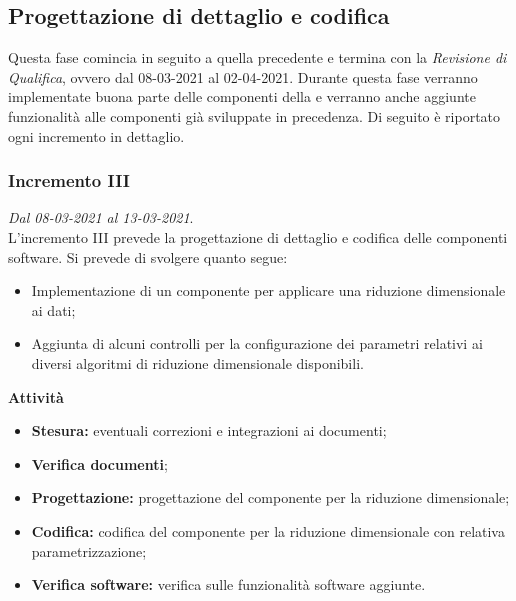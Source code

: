 \subsection{Progettazione di dettaglio e codifica}
Questa fase comincia in seguito a quella precedente e termina con la \textit{Revisione di Qualifica}, ovvero dal 08-03-2021 al 02-04-2021. Durante questa fase verranno implementate buona parte delle componenti della  e verranno anche aggiunte funzionalità alle componenti già sviluppate in precedenza.
Di seguito è riportato ogni incremento in dettaglio.

\subsubsection{Incremento III} 
\textit{Dal 08-03-2021 al 13-03-2021}.\\
L'incremento III prevede la progettazione di dettaglio e codifica delle componenti software. Si prevede di svolgere quanto segue:
\begin{itemize}
\item Implementazione di un componente per applicare una riduzione dimensionale ai dati;
\item Aggiunta di alcuni controlli per la configurazione dei parametri relativi ai diversi algoritmi di riduzione dimensionale disponibili.
\end{itemize}
\textbf{Attività}
\begin{itemize}
\item \textbf{Stesura:} eventuali correzioni e integrazioni ai documenti;
\item \textbf{Verifica documenti};
\item \textbf{Progettazione:} progettazione del componente per la riduzione dimensionale;
\item \textbf{Codifica:} codifica del componente per la riduzione dimensionale con relativa parametrizzazione;
\item \textbf{Verifica software:} verifica sulle funzionalità software aggiunte.
\end{itemize}
